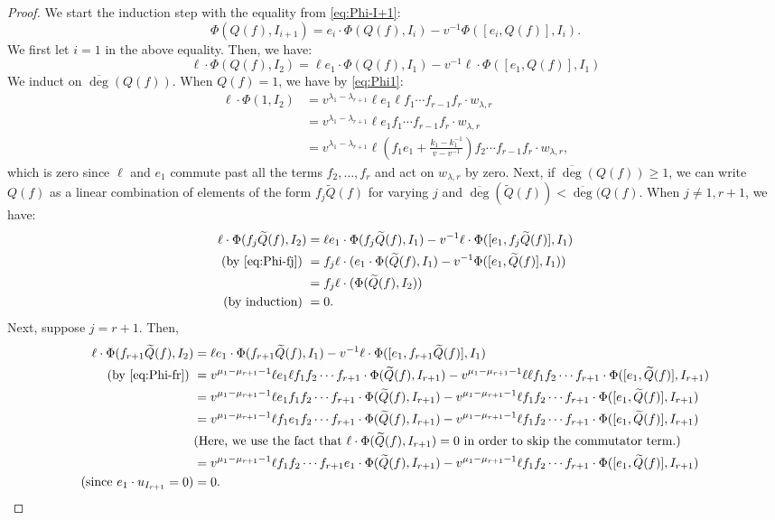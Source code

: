 \documentclass[10pt,a4paper]{amsart}
\newcommand{\ol}{\overline}
\begin{document}
\begin{proof}
We start the induction step with the equality from \eqref{eq:Phi-I+1}:
\[\Phi( Q(f),I_{i+1})=e_i\cdot \Phi( Q(f), I_i)-v^{-1}\Phi([e_i,Q(f)], I_{i}).\]
We first let $i=1$ in the above equality. Then, we have:
\[
\ell\cdot \Phi( Q(f),I_{2}) = \ell e_1\cdot \Phi( Q(f), I_1)-v^{-1}\ell\cdot \Phi([e_1,Q(f)], I_{1})
\]
We induct on $\ol{\deg}(Q(f))$. When $Q(f)=1$, we have by \eqref{eq:Phi1}: %
\begin{align*}\ell\cdot \Phi( 1,I_{2})&=v^{\lambda_1-\lambda_{r+1}}\ell e_1\ell f_1\cdots f_{r-1}f_r\cdot w_{\lambda, r}\\
&=v^{\lambda_1-\lambda_{r+1}}\ell e_1 f_1\cdots f_{r-1}f_r\cdot w_{\lambda, r}\\
&= v^{\lambda_1-\lambda_{r+1}}\ell \left(f_1e_1+\frac{k_1-k_1^{-1}}{v-v^{-1}}\right)f_2\cdots f_{r-1}f_r\cdot w_{\lambda, r},\end{align*}
which is zero since $\ell$ and $e_1$ commute past all the terms $f_2,\ldots, f_r$ and act on $w_{\lambda, r}$ by zero. Next, if $\ol\deg(Q(f))\geq 1$, we can write $Q(f)$ as a linear combination of elements of the form $f_{j}\widetilde Q(f)$ for varying $j$ and $\ol\deg(\widetilde Q(f))< \ol\deg(Q(f)$. When $j\neq 1, r+1$, we have:
\begin{align*}
\ell\cdot \Phi(f_j\widetilde Q(f),I_{2}) &= \ell e_1\cdot \Phi( f_j\widetilde Q(f), I_1)-v^{-1}\ell\cdot \Phi([e_1,f_j\widetilde Q(f)], I_{1})\\
\text{(by \eqref{eq:Phi-fj}) }&=f_j\ell\cdot( e_1\cdot \Phi( \widetilde Q(f), I_1)-v^{-1} \Phi([e_1,\widetilde Q(f)], I_{1}))\\
&=f_j\ell\cdot(\Phi(\widetilde{Q}(f),I_2))\\
\text{(by induction) }&=0.
\end{align*}
Next, suppose $j=r+1$. Then, 
\begin{align*}
\ell\cdot \Phi(f_{r+1}\widetilde Q(f),I_{2}) &= \ell e_1\cdot \Phi( f_{r+1}\widetilde Q(f), I_1)-v^{-1}\ell\cdot \Phi([e_1,f_{r+1}\widetilde Q(f)], I_{1})\\
\text{(by \eqref{eq:Phi-fr}) }&=v^{\mu_{1}-\mu_{r+1}-1}\ell e_1 \ell f_1f_2\cdots f_{r+1}\cdot \Phi( \widetilde Q(f), I_{r+1})-v^{\mu_{1}-\mu_{r+1}-1}\ell\ell f_1f_2\cdots f_{r+1}\cdot \Phi([e_1,\widetilde Q(f)], I_{r+1})\\
&=v^{\mu_{1}-\mu_{r+1}-1}\ell e_1 f_1f_2\cdots f_{r+1}\cdot \Phi( \widetilde Q(f), I_{r+1})-v^{\mu_{1}-\mu_{r+1}-1}\ell f_1f_2\cdots f_{r+1}\cdot \Phi([e_1,\widetilde Q(f)], I_{r+1})\\
&=v^{\mu_{1}-\mu_{r+1}-1}\ell f_1 e_1f_2\cdots f_{r+1}\cdot \Phi( \widetilde Q(f), I_{r+1})-v^{\mu_{1}-\mu_{r+1}-1}\ell f_1f_2\cdots f_{r+1}\cdot \Phi([e_1,\widetilde Q(f)], I_{r+1})\\
&\text{(Here, we use the fact that }\ell\cdot \Phi(\widetilde{Q}(f),I_{r+1})=0 \text{ in order to skip the commutator term}.)\\
&=v^{\mu_{1}-\mu_{r+1}-1}\ell f_1 f_2\cdots f_{r+1}e_1\cdot \Phi( \widetilde Q(f), I_{r+1})-v^{\mu_{1}-\mu_{r+1}-1}\ell f_1f_2\cdots f_{r+1}\cdot \Phi([e_1,\widetilde Q(f)], I_{r+1})\\
\text{(since $e_1\cdot u_{I_{r+1}}=0$)}&=0.
\end{align*}


\end{proof}
\end{document}
